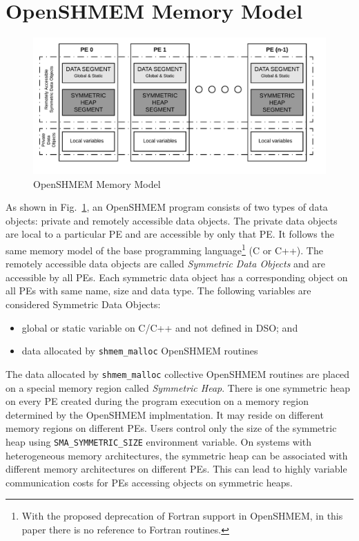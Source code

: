 \section{OpenSHMEM Memory Model}
\label{src:mmodel}
\begin{figure}[!h]
    \vspace{-30pt}
    \hspace*{5mm}
    \includegraphics[scale=0.20]{image/osm-mmodel.png}
    \vspace{-25pt}
    \caption{OpenSHMEM Memory Model}
    \vspace{-20pt}
    \label{fig:mmodel}
\end{figure}

As shown in Fig.~\ref{fig:mmodel}, an OpenSHMEM program consists of
two types of data objects: private and remotely
accessible data objects.
The private data objects are local
to a particular PE and are accessible by only that PE. It follows the
same memory model of the base programming language\footnote{With the
proposed deprecation of Fortran support in OpenSHMEM, in this paper
there is no reference to Fortran routines.} (C or C++). The
remotely accessible data objects are called
\emph{Symmetric Data Objects} and are accessible by all PEs.
Each symmetric data object has a corresponding object on all PEs
with same %
name, size and data type.%
The following variables are considered
Symmetric Data Objects:
\begin{itemize}
    \item global or static variable on C/C++ and not defined in DSO; and
    \item data allocated by \texttt{shmem\_malloc} OpenSHMEM routines
\end{itemize}

The data allocated by \texttt{shmem\_malloc} collective OpenSHMEM
routines are placed on a special memory region called \emph{Symmetric
Heap}. There is one symmetric heap on every PE created during the program
execution on a memory region determined by the OpenSHMEM implmentation.
It may reside on different memory regions on different PEs. Users
control only the size of the symmetric heap using
\texttt{SMA\_SYMMETRIC\_SIZE} environment variable.
On systems with heterogeneous memory architectures, the symmetric heap
can be associated with different memory architectures on different PEs.
This can lead to highly variable communication costs for PEs accessing
objects on symmetric heaps.

